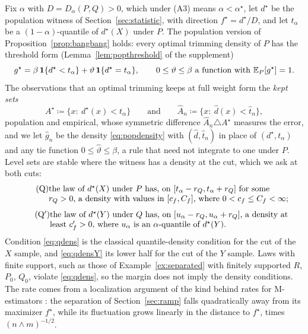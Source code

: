 Fix $\alpha$ with $D=D_\alpha(P,Q)>0$, which under (A3) means $\alpha<\alpha^\star$, let $d^\star$ be the population
witness of Section~\ref{sec:statistic}, with direction $f^\star=d^\star/D$, and let $t_\alpha$ be a $(1-\alpha)$-quantile
of $d^\star(X)$ under $P$. The population version of Proposition~\ref{prop:bangbang} holds: every optimal trimming
density of $P$ has the threshold form (Lemma~\ref{lem:popthreshold} of the supplement)
\begin{equation}
g^\star=\beta\,\mathbf 1\{d^\star<t_\alpha\}+\vartheta\,\mathbf 1\{d^\star=t_\alpha\},
\qquad 0\le\vartheta\le\beta\ \text{a function with}\ \mathbb{E}_P[g^\star]=1 .
\label{eq:popdensity}
\end{equation}
The observations that an optimal trimming keeps at full weight form the \emph{kept sets}
\[
A^\star\coloneqq\{x:\ d^\star(x)<t_\alpha\}
\qquad\text{and}\qquad
\widehat A_n\coloneqq\{x:\ \widehat d(x)<\widehat t_n\},
\]
population and empirical, whose symmetric difference $\widehat A_n\triangle A^\star$ measures the error, and we let
$\widehat g_n$ be the density \eqref{eq:popdensity} with $(\widehat d,\widehat t_n)$ in place of $(d^\star,t_\alpha)$
and any tie function $0\le\widehat\vartheta\le\beta$, a rule that need not integrate to one under $P$. Level sets are
stable where the witness has a density at the cut, which we ask at both cuts:
\begin{gather}
\tag{Q}\label{eq:qdens}
\parbox[t]{0.84\textwidth}{\raggedright the law of $d^\star(X)$ under $P$ has, on $[t_\alpha-r_Q,t_\alpha+r_Q]$ for some
$r_Q>0$, a density with values in $[c_f,C_f]$, where $0<c_f\le C_f<\infty$;}\\[4pt]
\tag{Q$'$}\label{eq:qdensY}
\parbox[t]{0.84\textwidth}{\raggedright the law of $d^\star(Y)$ under $Q$ has, on $[u_\alpha-r_Q,u_\alpha+r_Q]$, a
density at least $c'_f>0$, where $u_\alpha$ is an $\alpha$-quantile of $d^\star(Y)$.}
\end{gather}
Condition \eqref{eq:qdens} is the classical quantile-density condition for the cut of the $X$ sample, and
\eqref{eq:qdensY} its lower half for the cut of the $Y$ sample. Laws with finite support, such as those of
Example~\ref{ex:separated} with finitely supported $R$, $P_0$, $Q_0$, violate \eqref{eq:qdens}, so the margin does not imply the density conditions. The rate comes from a localization argument of the kind behind rates for M-estimators
\citep[Theorem~3.2.5]{vandervaart1996weak}: the separation of Section~\ref{sec:ramp} falls quadratically away from its
maximizer $f^\star$, while its fluctuation grows linearly in the distance to $f^\star$, times $(n\wedge m)^{-1/2}$.

